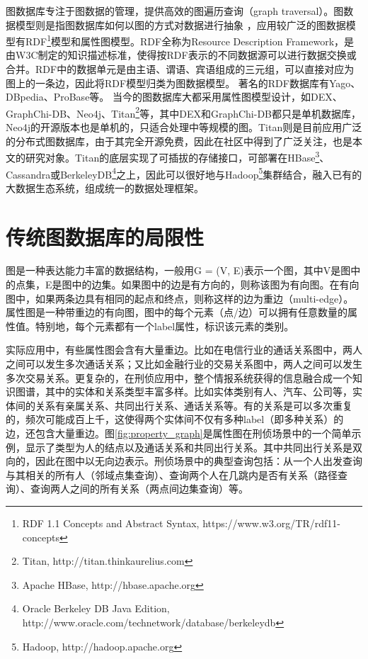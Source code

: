 图数据库专注于图数据的管理，提供高效的图遍历查询（graph traversal）。图数据模型则是指图数据库如何以图的方式对数据进行抽象 \supercite{graph_models_survey}，应用较广泛的图数据模型有RDF\footnote{RDF 1.1 Concepts and Abstract Syntax, https://www.w3.org/TR/rdf11-concepts }模型和属性图\supercite{property_graph}模型。RDF全称为Resource Description Framework，是由W3C制定的知识描述标准，使得按RDF表示的不同数据源可以进行数据交换或合并。RDF中的数据单元是由主语、谓语、宾语组成的三元组，可以直接对应为图上的一条边，因此将RDF模型归类为图数据模型。
著名的RDF数据库有Yago\supercite{yago}、DBpedia\supercite{dbpedia}、ProBase\supercite{probase}等。
当今的图数据库大都采用属性图模型设计\supercite{graph_database_models}，如DEX\supercite{DEX}、GraphChi-DB\supercite{graphchi-db}、Neo4j\supercite{neo4j}、Titan\footnote{Titan, http://titan.thinkaurelius.com}等，其中DEX和GraphChi-DB都只是单机数据库，Neo4j的开源版本也是单机的，只适合处理中等规模的图。Titan则是目前应用广泛的分布式图数据库，由于其完全开源免费，因此在社区中得到了广泛关注，也是本文的研究对象。Titan的底层实现了可插拔的存储接口，可部署在HBase\footnote{Apache HBase, http://hbase.apache.org }、Cassandra\supercite{cassandra}或BerkeleyDB\footnote{Oracle Berkeley DB Java Edition, http://www.oracle.com/technetwork/database/berkeleydb }之上，因此可以很好地与Hadoop\footnote{Hadoop, http://hadoop.apache.org }集群结合，融入已有的大数据生态系统，组成统一的数据处理框架。

\section{传统图数据库的局限性}
图是一种表达能力丰富的数据结构，一般用G = (V, E)表示一个图，其中V是图中的点集，E是图中的边集。如果图中的边是有方向的，则称该图为有向图。在有向图中，如果两条边具有相同的起点和终点，则称这样的边为重边（multi-edge）。属性图\supercite{property_graph}是一种带重边的有向图，图中的每个元素（点/边）可以拥有任意数量的属性值。特别地，每个元素都有一个label属性，标识该元素的类别。

实际应用中，有些属性图会含有大量重边。比如在电信行业的通话关系图中，两人之间可以发生多次通话关系；又比如金融行业的交易关系图中，两人之间可以发生多次交易关系。更复杂的，在刑侦应用中，整个情报系统获得的信息融合成一个知识图谱\supercite{knowledge_graph}，其中的实体和关系类型丰富多样。比如实体类别有人、汽车、公司等，实体间的关系有亲属关系、共同出行关系、通话关系等。有的关系是可以多次重复的，频次可能成百上千，这使得两个实体间不仅有多种label（即多种关系）的边，还包含大量重边。图\ref{fig:property_graph}是属性图在刑侦场景中的一个简单示例，显示了类型为人的结点以及通话关系和共同出行关系。其中共同出行关系是双向的，因此在图中以无向边表示。刑侦场景中的典型查询包括：从一个人出发查询与其相关的所有人（邻域点集查询）、查询两个人在几跳内是否有关系（路径查询）、查询两人之间的所有关系（两点间边集查询）等。

